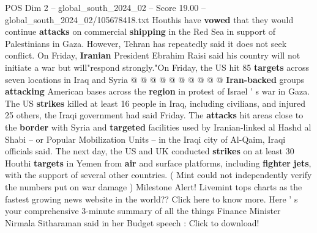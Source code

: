 \begin{textsample}{POS Dim 2 – global\_south\_2024\_02 – Score 19.00 – global\_south\_2024\_02/105678418.txt}
Houthis have \textbf{vowed} that they would continue \textbf{attacks} on commercial \textbf{shipping} in the Red Sea in support of Palestinians in Gaza.
However, Tehran has repeatedly said it does not seek conflict.
On Friday, \textbf{Iranian} President Ebrahim Raisi said his country will not initiate a war but will"respond strongly."On Friday, the US hit 85 \textbf{targets} across seven locations in Iraq and Syria @ @ @ @ @ @ @ @ @ @ \textbf{Iran-backed} groups \textbf{attacking} American bases across the \textbf{region} in protest of Israel ' s war in Gaza.
The US \textbf{strikes} killed at least 16 people in Iraq, including civilians, and injured 25 others, the Iraqi government had said Friday.
The \textbf{attacks} hit areas close to the \textbf{border} with Syria and \textbf{targeted} facilities used by Iranian-linked al Hashd al Shabi -- or Popular Mobilization Units -- in the Iraqi city of Al-Qaim, Iraqi officials said.
The next day, the US and UK conducted \textbf{strikes} on at least 30 Houthi \textbf{targets} in Yemen from \textbf{air} and surface platforms, including \textbf{fighter} \textbf{jets}, with the support of several other countries. ( Mint could not independently verify the numbers put on war damage ) Milestone Alert!
Livemint tops charts as the fastest growing news website in the world??
Click here to know more.
Here ' s your comprehensive 3-minute summary of all the things Finance Minister Nirmala Sitharaman said in her Budget speech : Click to download!

\end{textsample}
